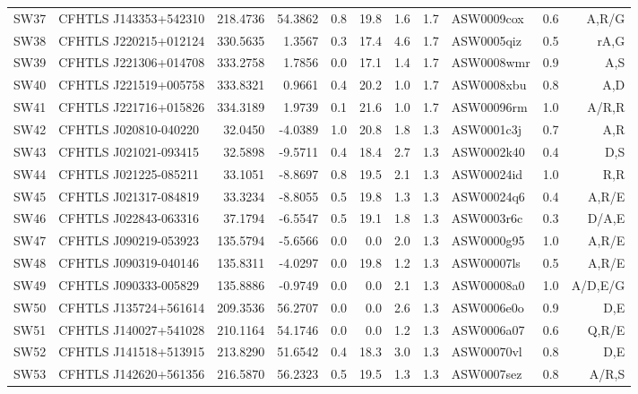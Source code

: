 \documentclass[useAMS,usenatbib,a4paper]{mn2e}
\begin{document}
\begin{center}
\begin{longtable}{llrrrrrrlrr}
SW37 & CFHTLS J143353+542310 &  218.4736 &   54.3862 &  0.8 & 19.8 &  1.6 &  1.7 & ASW0009cox &  0.6  &  A,R/G   \\
SW38 & CFHTLS J220215+012124 &  330.5635 &    1.3567 &  0.3 & 17.4 &  4.6 &  1.7 & ASW0005qiz &  0.5  &  rA,G   \\
SW39 & CFHTLS J221306+014708 &  333.2758 &    1.7856 &  0.0 & 17.1 &  1.4 &  1.7 & ASW0008wmr &  0.9  &  A,S   \\
SW40 & CFHTLS J221519+005758 &  333.8321 &    0.9661 &  0.4 & 20.2 &  1.0 &  1.7 & ASW0008xbu &  0.8  &  A,D   \\
SW41 & CFHTLS J221716+015826 &  334.3189 &    1.9739 &  0.1 & 21.6 &  1.0 &  1.7 & ASW00096rm &  1.0  &  A/R,R   \\
SW42 & CFHTLS J020810-040220 &   32.0450 &   -4.0389 &  1.0 & 20.8 &  1.8 &  1.3 & ASW0001c3j &  0.7  &  A,R   \\
SW43 & CFHTLS J021021-093415 &   32.5898 &   -9.5711 &  0.4 & 18.4 &  2.7 &  1.3 & ASW0002k40 &  0.4  &  D,S   \\
SW44 & CFHTLS J021225-085211 &   33.1051 &   -8.8697 &  0.8 & 19.5 &  2.1 &  1.3 & ASW00024id &  1.0  &  R,R   \\
SW45 & CFHTLS J021317-084819 &   33.3234 &   -8.8055 &  0.5 & 19.8 &  1.3 &  1.3 & ASW00024q6 &  0.4  &  A,R/E   \\
SW46 & CFHTLS J022843-063316 &   37.1794 &   -6.5547 &  0.5 & 19.1 &  1.8 &  1.3 & ASW0003r6c &  0.3  &  D/A,E   \\
SW47 & CFHTLS J090219-053923 &  135.5794 &   -5.6566 &  0.0 &  0.0 &  2.0 &  1.3 & ASW0000g95 &  1.0  &  A,R/E   \\
SW48 & CFHTLS J090319-040146 &  135.8311 &   -4.0297 &  0.0 & 19.8 &  1.2 &  1.3 & ASW00007ls &  0.5  &  A,R/E   \\
SW49 & CFHTLS J090333-005829 &  135.8886 &   -0.9749 &  0.0 &  0.0 &  2.1 &  1.3 & ASW00008a0 &  1.0  &  A/D,E/G   \\
SW50 & CFHTLS J135724+561614 &  209.3536 &   56.2707 &  0.0 &  0.0 &  2.6 &  1.3 & ASW0006e0o &  0.9  &  D,E   \\
SW51 & CFHTLS J140027+541028 &  210.1164 &   54.1746 &  0.0 &  0.0 &  1.2 &  1.3 & ASW0006a07 &  0.6  &  Q,R/E   \\
SW52 & CFHTLS J141518+513915 &  213.8290 &   51.6542 &  0.4 & 18.3 &  3.0 &  1.3 & ASW00070vl &  0.8  &  D,E   \\
SW53 & CFHTLS J142620+561356 &  216.5870 &   56.2323 &  0.5 & 19.5 &  1.3 &  1.3 & ASW0007sez &  0.8  &  A/R,S   \\

\end{longtable}
\end{center}
\end{document}

